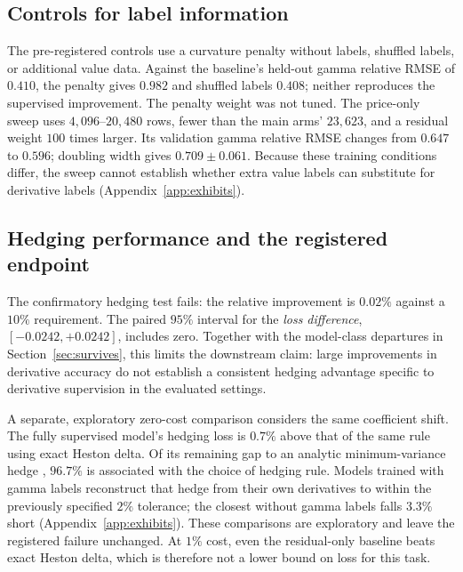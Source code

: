 \documentclass{article}
\begin{document}
\subsection{Controls for label information}
\label{sec:controls}

The pre-registered controls use a curvature penalty without labels, shuffled
labels, or additional value data. Against the baseline's held-out gamma relative
RMSE of $0.410$, the penalty gives $0.982$ and shuffled labels $0.408$; neither
reproduces the supervised improvement. The penalty weight was not tuned.
The price-only sweep uses $4{,}096$--$20{,}480$ rows, fewer than the main arms'
$23{,}623$, and a residual weight $100$ times larger. Its validation gamma relative
RMSE changes from $0.647$ to $0.596$; doubling width gives $0.709\pm0.061$.
Because these training conditions differ, the sweep cannot establish whether extra
value labels can substitute for derivative labels (Appendix~\ref{app:exhibits}).

\subsection{Hedging performance and the registered endpoint}
\label{sec:coda}

The confirmatory hedging test fails: the relative improvement is $0.02\%$ against a
$10\%$ requirement. The paired $95\%$ interval for the \emph{loss difference},
$[-0.0242,+0.0242]$, includes zero. Together with the model-class departures in
Section~\ref{sec:survives}, this limits the downstream claim: large improvements
in derivative accuracy do not establish a consistent hedging advantage specific to
derivative supervision in the evaluated settings.

A separate, exploratory zero-cost comparison considers the same coefficient shift.
The fully supervised model's hedging loss is $0.7\%$ above that of the same rule using exact
Heston delta. Of its remaining gap to an analytic minimum-variance hedge
\citep{follmer1991hedging,hull2017optimal}, $96.7\%$ is associated with the choice
of hedging rule. Models trained with gamma labels reconstruct that hedge from their
own derivatives to within the previously specified $2\%$ tolerance; the closest
without gamma labels falls $3.3\%$ short (Appendix~\ref{app:exhibits}). These
comparisons are exploratory and leave the registered failure unchanged. At $1\%$
cost, even the residual-only baseline beats exact Heston delta, which is therefore
not a lower bound on loss for this task.
\end{document}
